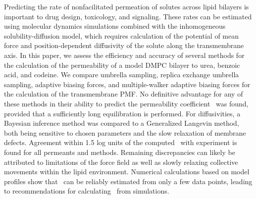 Predicting the rate of nonfacilitated permeation of solutes across lipid bilayers is important to drug design, toxicology, and signaling. These rates can be estimated using molecular dynamics simulations combined with the inhomogeneous solubility-diffusion model, which requires calculation of the potential of mean force and position-dependent diffusivity of the solute along the transmembrane axis. In this paper, we assess the efficiency and accuracy of several methods for the calculation of the permeability of a model DMPC bilayer to urea, benzoic acid, and codeine. We compare umbrella sampling, replica exchange umbrella sampling, adaptive biasing forces, and multiple-walker adaptive biasing forces for the calculation of the transmembrane PMF. No definitive advantage for any of these methods in their ability to predict the permeability coefficient \perm~was found, provided that a sufficiently long equilibration is performed. For diffusivities, a Bayesian inference method was compared to a Generalized Langevin method, both being sensitive to chosen parameters and the slow relaxation of membrane defects.  
Agreement within 1.5 log units of the computed \perm~with experiment is found for all permeants and methods.  Remaining discrepancies can likely be attributed to limitations of the force field as well as slowly relaxing collective movements within the lipid environment.  Numerical calculations based on model profiles show that \perm~can be reliably estimated from only a few data points, leading to recommendations for calculating \perm~from simulations.


